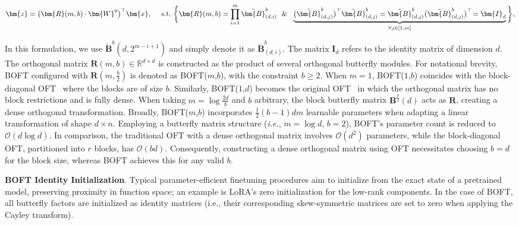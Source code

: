 \begin{equation}
    \begin{aligned}\nonumber
    \bm{z}=\big(\bm{R}(m,b)\cdot\bm{W}^0\big)^\top\bm{x},~~~~\text{s.t.}~\bigg{\{}\bm{R}(m,b)=\prod_{i=1}^m \tilde{\bm{B}}^b_{(d,i)}~~\&~~\underbrace{\big(\tilde{\bm{B}}^b_{(d,j)}\big)^\top\tilde{\bm{B}}^b_{(d,j)}=\tilde{\bm{B}}^b_{(d,j)}\big(\tilde{\bm{B}}^b_{(d,j)}\big)^\top\!=\bm{I}_d}_{\forall j\in [1, m]}\bigg{\}},
    \end{aligned}
\end{equation}

In this formulation, we use $\tilde{\bm{B}}^b(d,2^{m - i+1})$ and simply denote it as $\tilde{\bm{B}}^b_{(d,i)}$. The matrix $\bm{I}_d$ refers to the identity matrix of dimension $d$. The orthogonal matrix $\bm{R}(m,b) \in \mathbb{R}^{d\times d}$ is constructed as the product of several orthogonal butterfly modules. For notational brevity, BOFT configured with $\bm{R}(m,\frac{b}{2})$ is denoted as BOFT($m$,$b$), with the constraint $b \geq 2$. When $m=1$, BOFT($1$,$b$) coincides with the block-diagonal OFT~\cite{qiu2023controlling} where the blocks are of size $b$. Similarly, BOFT($1$,$d$) becomes the original OFT~\cite{qiu2023controlling} in which the orthogonal matrix has no block restrictions and is fully dense. When taking $m = \log \frac{2d}{b}$ and $b$ arbitrary, the block butterfly matrix $\bm{B}^{\frac{b}{2}}(d)$ acts as $\bm{R}$, creating a dense orthogonal transformation. Broadly, BOFT($m$,$b$) incorporates $\frac{1}{2}(b-1)dm$ learnable parameters when adapting a linear transformation of shape $d\times n$. Employing a butterfly matrix structure (\emph{i.e.}, $m=\log d$, $b=2$), BOFT’s parameter count is reduced to $\mathcal{O}(d\log d)$. In comparison, the traditional OFT with a dense orthogonal matrix involves $\mathcal{O}(d^2)$ parameters, while the block-diagonal OFT, partitioned into $r$ blocks, has $\mathcal{O}(bd)$. Consequently, constructing a dense orthogonal matrix using OFT necessitates choosing $b=d$ for the block size, whereas BOFT achieves this for any valid $b$.

\textbf{BOFT Identity Initialization}. Typical parameter-efficient finetuning procedures aim to initialize from the exact state of a pretrained model, preserving proximity in function space; an example is LoRA’s zero initialization for the low-rank components. In the case of BOFT, all butterfly factors are initialized as identity matrices (i.e., their corresponding skew-symmetric matrices are set to zero when applying the Cayley transform).

